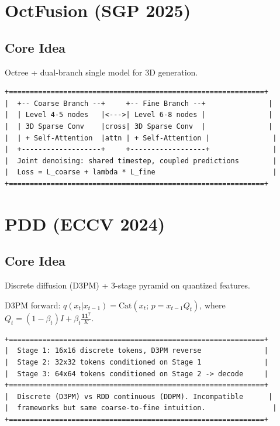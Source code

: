 \documentclass[11pt, a4paper]{article}
\begin{document}
\section{OctFusion (SGP 2025)}

\subsection{Core Idea}
Octree + dual-branch single model for 3D generation.

\begin{lstlisting}[style=flowchart, caption={OctFusion Architecture}]
+=============================================================+
|  +-- Coarse Branch --+     +-- Fine Branch --+               |
|  | Level 4-5 nodes   |<--->| Level 6-8 nodes |               |
|  | 3D Sparse Conv    |cross| 3D Sparse Conv  |               |
|  | + Self-Attention  |attn | + Self-Attention |               |
|  +-------------------+     +------------------+               |
|  Joint denoising: shared timestep, coupled predictions        |
|  Loss = L_coarse + lambda * L_fine                            |
+=============================================================+
\end{lstlisting}

\section{PDD (ECCV 2024)}

\subsection{Core Idea}
Discrete diffusion (D3PM) + 3-stage pyramid on quantized features.

D3PM forward: $q(x_t|x_{t-1}) = \mathrm{Cat}(x_t;\, p = x_{t-1} Q_t)$, where $Q_t = (1-\beta_t)I + \beta_t \frac{\mathbf{1}\mathbf{1}^T}{K}$.

\begin{lstlisting}[style=flowchart, caption={PDD Pipeline}]
+=============================================================+
|  Stage 1: 16x16 discrete tokens, D3PM reverse               |
|  Stage 2: 32x32 tokens conditioned on Stage 1               |
|  Stage 3: 64x64 tokens conditioned on Stage 2 -> decode     |
+=============================================================+
|  Discrete (D3PM) vs RDD continuous (DDPM). Incompatible      |
|  frameworks but same coarse-to-fine intuition.                |
+=============================================================+
\end{lstlisting}
\end{document}
